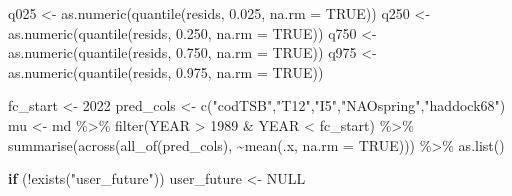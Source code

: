 \documentclass[
  letterpaper,
  DIV=11,
  numbers=noendperiod]{scrreprt}
\newenvironment{Shaded}{\begin{snugshade}}{\end{snugshade}}
\newcommand{\AttributeTok}[1]{\textcolor[rgb]{0.40,0.45,0.13}{#1}}
\newcommand{\ConstantTok}[1]{\textcolor[rgb]{0.56,0.35,0.01}{#1}}
\newcommand{\ControlFlowTok}[1]{\textcolor[rgb]{0.00,0.23,0.31}{\textbf{#1}}}
\newcommand{\DecValTok}[1]{\textcolor[rgb]{0.68,0.00,0.00}{#1}}
\newcommand{\FloatTok}[1]{\textcolor[rgb]{0.68,0.00,0.00}{#1}}
\newcommand{\FunctionTok}[1]{\textcolor[rgb]{0.28,0.35,0.67}{#1}}
\newcommand{\NormalTok}[1]{\textcolor[rgb]{0.00,0.23,0.31}{#1}}
\newcommand{\OtherTok}[1]{\textcolor[rgb]{0.00,0.23,0.31}{#1}}
\newcommand{\SpecialCharTok}[1]{\textcolor[rgb]{0.37,0.37,0.37}{#1}}
\newcommand{\StringTok}[1]{\textcolor[rgb]{0.13,0.47,0.30}{#1}}
\begin{document}
\begin{Shaded}
\begin{Highlighting}[]
\NormalTok{q025 }\OtherTok{\textless{}{-}} \FunctionTok{as.numeric}\NormalTok{(}\FunctionTok{quantile}\NormalTok{(resids, }\FloatTok{0.025}\NormalTok{, }\AttributeTok{na.rm =} \ConstantTok{TRUE}\NormalTok{))}
\NormalTok{q250 }\OtherTok{\textless{}{-}} \FunctionTok{as.numeric}\NormalTok{(}\FunctionTok{quantile}\NormalTok{(resids, }\FloatTok{0.250}\NormalTok{, }\AttributeTok{na.rm =} \ConstantTok{TRUE}\NormalTok{))}
\NormalTok{q750 }\OtherTok{\textless{}{-}} \FunctionTok{as.numeric}\NormalTok{(}\FunctionTok{quantile}\NormalTok{(resids, }\FloatTok{0.750}\NormalTok{, }\AttributeTok{na.rm =} \ConstantTok{TRUE}\NormalTok{))}
\NormalTok{q975 }\OtherTok{\textless{}{-}} \FunctionTok{as.numeric}\NormalTok{(}\FunctionTok{quantile}\NormalTok{(resids, }\FloatTok{0.975}\NormalTok{, }\AttributeTok{na.rm =} \ConstantTok{TRUE}\NormalTok{))}

\NormalTok{fc\_start }\OtherTok{\textless{}{-}} \DecValTok{2022}
\NormalTok{pred\_cols }\OtherTok{\textless{}{-}} \FunctionTok{c}\NormalTok{(}\StringTok{"codTSB"}\NormalTok{,}\StringTok{"T12"}\NormalTok{,}\StringTok{"I5"}\NormalTok{,}\StringTok{"NAOspring"}\NormalTok{,}\StringTok{"haddock68"}\NormalTok{)}
\NormalTok{mu }\OtherTok{\textless{}{-}}\NormalTok{ md }\SpecialCharTok{\%\textgreater{}\%} \FunctionTok{filter}\NormalTok{(YEAR }\SpecialCharTok{\textgreater{}} \DecValTok{1989} \SpecialCharTok{\&}\NormalTok{ YEAR }\SpecialCharTok{\textless{}}\NormalTok{ fc\_start) }\SpecialCharTok{\%\textgreater{}\%} \FunctionTok{summarise}\NormalTok{(}\FunctionTok{across}\NormalTok{(}\FunctionTok{all\_of}\NormalTok{(pred\_cols), }\SpecialCharTok{\textasciitilde{}}\FunctionTok{mean}\NormalTok{(.x, }\AttributeTok{na.rm =} \ConstantTok{TRUE}\NormalTok{))) }\SpecialCharTok{\%\textgreater{}\%} \FunctionTok{as.list}\NormalTok{()}

\ControlFlowTok{if}\NormalTok{ (}\SpecialCharTok{!}\FunctionTok{exists}\NormalTok{(}\StringTok{"user\_future"}\NormalTok{)) user\_future }\OtherTok{\textless{}{-}} \ConstantTok{NULL}


\end{Highlighting}
\end{Shaded}
\end{document}
